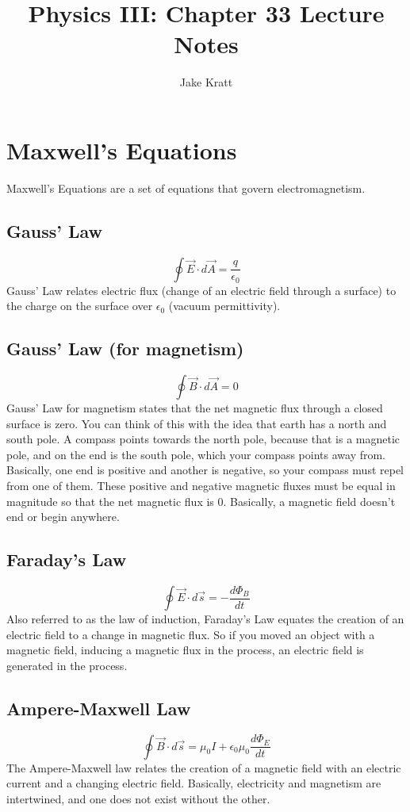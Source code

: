 \documentclass[12pt]{article}
\title{Physics III: Chapter 33 Lecture Notes}
\author{Jake Kratt}
\begin{document}
\maketitle

\section*{Maxwell's Equations}
Maxwell's Equations are a set of equations that govern electromagnetism.
\subsection*{Gauss' Law}
    \[\oint \vec{E}\cdot  d\vec{A} = \frac{q}{\epsilon_{0}}\]
Gauss' Law relates electric flux (change of an electric field through a surface) to the charge on the surface over $\epsilon_{0}$ (vacuum permittivity).

\subsection*{Gauss' Law (for magnetism)}
\[\oint \vec{B} \cdot d\vec{A}=0\]
Gauss' Law for magnetism states that the net magnetic flux through a closed surface is zero. You can think of this with the idea that earth has a north and south pole. A compass points towards the north pole, because that is a magnetic pole, and on the end is the south pole, which your compass points away from. Basically, one end is positive and another is negative, so your compass must repel from one of them. These positive and negative magnetic fluxes must be equal in magnitude so that the net magnetic flux is 0. Basically, a magnetic field doesn't end or begin anywhere.

\subsection*{Faraday's Law}
\[\oint \vec{E} \cdot d\vec{s} = - \frac{d\Phi_{B}}{dt}\]
Also referred to as the law of induction, Faraday's Law equates the creation of an electric field to a change in magnetic flux. So if you moved an object with a magnetic field, inducing a magnetic flux in the process, an electric field is generated in the process.

\subsection*{Ampere-Maxwell Law}
\[\oint \vec{B} \cdot d\vec{s} = \mu_{0}I + \epsilon_{0}\mu_{0} \frac{d\Phi_{E}}{dt}\]
The Ampere-Maxwell law relates the creation of a magnetic field with an electric current and a changing electric field. Basically, electricity and magnetism are intertwined, and one does not exist without the other.
\end{document}

